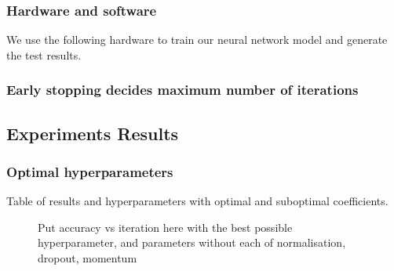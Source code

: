 \subsubsection{Hardware and software}
We use the following hardware to train our neural network model and generate the test results.

\subsubsection{Early stopping decides maximum number of iterations}

\subsection{Experiments Results}
\subsubsection{Optimal hyperparameters}

Table of results and hyperparameters with optimal and suboptimal coefficients.

\begin{figure}
	\centering
\caption{Put accuracy vs iteration here with the best possible hyperparameter, and parameters without each of normalisation, dropout, momentum}\label{noisesklnmff}
\end{figure}


